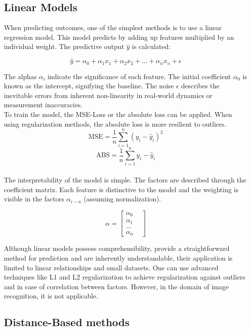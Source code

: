 \subsection{Linear Models}

When predicting outcomes, one of the simplest methods is to use a linear regression model. This model predicts by adding up features multiplied by an individual weight. The predictive output $\hat{y}$ is calculated:

$$ \hat{y}= \alpha_0 + \alpha_1 x_1 + \alpha_2 x_2 +... +\alpha_n x_{n} + \epsilon$$

The alphas $\alpha_i$ indicate the significance of each feature. The initial coefficient $\alpha_0$ is known as the intercept, signifying the baseline. The noise $\epsilon$ describes the inevitable errors from inherent non-linearity in real-world dynamics or measurement inaccuracies.
\\
To train the model, the MSE-Loss or the absolute loss can be applied. When using regularization methods, the absolute loss is more resilient to outliers.
$$ \text{MSE} = \frac{1}{n} \sum_{i=1}^{n} (y_i - \hat{y}_i)^2$$
$$ \text{ABS} = \frac{1}{n} \sum_{i=1}^{n} y_i - \hat{y}_i$$
\\
The interpretability of the model is simple. The factors are described through the coefficient matrix. Each feature is distinctive to the model and the weighting is visible in the factors $\alpha_{i-n}$ (assuming normalization).

$$ \alpha = \begin{bmatrix}
	\alpha_0 & \\
	\alpha_1 & \\
	... & \\
	\alpha_n &
\end{bmatrix}
$$


Although linear models possess comprehensibility, provide a straightforward method for prediction and are inherently understandable, their application is limited to linear relationships and small datasets. One can use advanced techniques like L1 and L2 regularization \cite{jerome2010} to achieve regularization against outliers and in case of correlation between factors. However, in the domain of image recognition, it is not applicable.

\subsection{Distance-Based methods}

